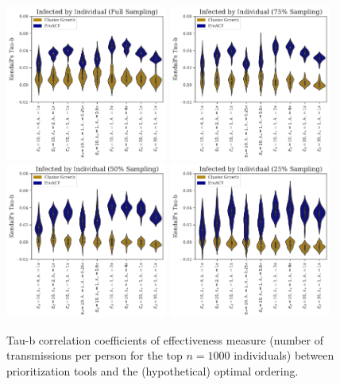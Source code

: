 \documentclass[a4paper,11pt]{article}
\begin{document}
\clearpage

\begin{figure}[!h]
\centering
\includegraphics[width=0.475\textwidth]{figs/results_efficacy_tau_individual.pdf}
\includegraphics[width=0.475\textwidth]{figs/results_efficacy_tau_individual_sub75.pdf}\\
\includegraphics[width=0.475\textwidth]{figs/results_efficacy_tau_individual_sub50.pdf}
\includegraphics[width=0.475\textwidth]{figs/results_efficacy_tau_individual_sub25.pdf}\\
\caption{{Tau-b correlation coefficients of effectiveness measure (number of transmissions per person for the top $n=1000$ individuals) between prioritization tools and the (hypothetical) optimal ordering.}}\label{fig:tau-b-values}
\end{figure}
\end{document}
